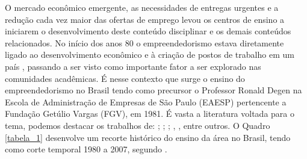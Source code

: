 O mercado econômico emergente, as necessidades de entregas urgentes e a redução cada vez maior das ofertas de emprego levou os centros de ensino a iniciarem o desenvolvimento deste conteúdo disciplinar e os demais conteúdos relacionados. No início dos anos 80 o empreendedorismo estava diretamente ligado ao desenvolvimento econômico e à criação de postos de trabalho em um país \cite{rodrigues_intencao_2019}, passando a ser visto como importante fator a ser explorado nas comunidades acadêmicas. É nesse contexto que surge o ensino do empreendedorismo no Brasil tendo como precursor o Professor Ronald Degen \cite{koerner_designing_1990} na Escola de Administração de Empresas de São Paulo (EAESP) pertencente a Fundação Getúlio Vargas (FGV), em 1981. É vasta a literatura voltada para o tema, podemos destacar os trabalhos de: ; ; ; , , entre outros. O Quadro \ref{tabela_1} desenvolve um recorte histórico do ensino da área no Brasil, tendo como corte temporal 1980 a 2007, segundo \cite{fernandes_breve_2013}. 


